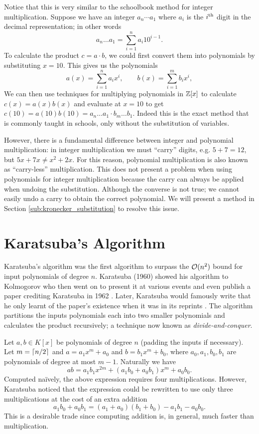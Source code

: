 Notice that this is very similar to the schoolbook method for integer multiplication. Suppose we have an integer $a_n \cdots a_1$ where $a_i$ is the $i^\textrm{th}$ digit in the decimal representation; in other words
\[
    a_n \ldots a_1 = \sum^n_{i=1} a_i 10^{i-1}.
\]
To calculate the product $c = a \cdot b$, we could first convert them into polynomials by substituting $x = 10$. This gives us the polynomials
\[
    a(x) = \sum^n_{i=1} a_ix^i, \qquad b(x) = \sum^m_{i=1} b_ix^i,
\]
We can then use techniques for multiplying polynomials in ${\mathbb Z}[x]$ to calculate $c(x) = a(x)b(x)$ and evaluate at $x = 10$ to get $c(10) = a(10)b(10) = a_n\ldots a_1 \cdot b_m\ldots b_1$. Indeed this is the exact method that is commonly taught in schools, only without the substitution of variables.

However, there is a fundamental difference between integer and polynomial multiplication: in integer multiplication we must ``carry'' digits, e.g. $5 + 7 = 12$, but $5x + 7x \neq x^2 + 2x$. For this reason, polynomial multiplication is also known as ``carry-less'' multiplication. This does not present a problem when using polynomials for integer multiplication because the carry can always be applied when undoing the substitution. Although the converse is not true; we cannot easily undo a carry to obtain the correct polynomial. We will present a method in Section \ref{sub:kronecker_substitution} to resolve this issue.

\section{Karatsuba's Algorithm}
\label{sec:prelim-karatsuba}

Karatsuba's algorithm was the first algorithm to surpass the $\mathcal O(n^2)$ bound for input polynomials of degree $n$. Karatsuba (1960) showed his algorithm to Kolmogorov who then went on to present it at various events and even publish a paper crediting Karatsuba in 1962 \cite{karatsuba}. Later, Karatsuba would famously write that he only learnt of the paper's existence when it was in its reprints \cite{karatsuba1995}. The algorithm partitions the inputs polynomials each into two smaller polynomials and calculates the product recursively; a technique now known as \emph{divide-and-conquer}. 

Let $a, b \in K[x]$ be polynomials of degree $n$ (padding the inputs if necessary). Let $m = \left \lceil n/2 \right \rceil$ and $a = a_1x^m + a_0$ and $b = b_1x^m + b_0$, where $a_0, a_1, b_0, b_1$ are polynomials of degree at most $m - 1$. Naturally we have
\[
    ab = a_1b_1x^{2m} + (a_1b_0 + a_0b_1)x^m + a_0b_0.
\]
Computed na\"{i}vely, the above expression requires four multiplications. However, Karatsuba noticed that the expression could be rewritten to use only three multiplications at the cost of an extra addition 
\[
    a_1b_0 + a_0b_1 = (a_1 + a_0)(b_1 + b_0) - a_1b_1 - a_0b_0.
\]
This is a desirable trade since computing addition is, in general, much faster than multiplication.

